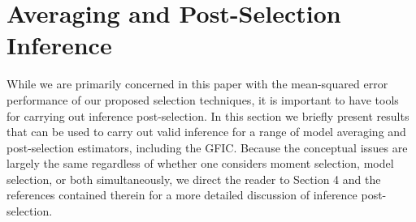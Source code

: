 \section{Averaging and Post-Selection Inference}
\label{sec:avg}

While we are primarily concerned in this paper with the mean-squared error performance of our proposed selection techniques, it is important to have tools for carrying out  inference post-selection.
In this section we briefly present results that can be used to carry out valid inference for a range of model averaging and post-selection estimators, including the GFIC.
Because the conceptual issues are largely the same regardless of whether one considers moment selection, model selection, or both simultaneously, we direct the reader to \cite{DiTraglia2016} Section 4 and the references contained therein for a more detailed discussion of inference post-selection.

